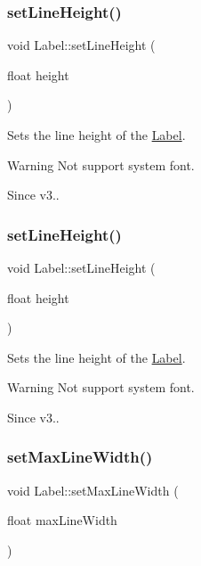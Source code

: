 \subsubsection{\texorpdfstring{set\+Line\+Height()}{setLineHeight()}\hspace{0.1cm}{\footnotesize\ttfamily [1/2]}}
{\footnotesize\ttfamily void Label\+::set\+Line\+Height (\begin{DoxyParamCaption}\item[{float}]{height }\end{DoxyParamCaption})}

Sets the line height of the \hyperlink{classLabel}{Label}. \begin{DoxyWarning}{Warning}
Not support system font. 
\end{DoxyWarning}
\begin{DoxySince}{Since}
v3.. 
\end{DoxySince}
\mbox{\label{classLabel_acb0bd4b5aa05360a85f18def21cd7e4d}} 
\subsubsection{\texorpdfstring{set\+Line\+Height()}{setLineHeight()}\hspace{0.1cm}{\footnotesize\ttfamily [2/2]}}
{\footnotesize\ttfamily void Label\+::set\+Line\+Height (\begin{DoxyParamCaption}\item[{float}]{height }\end{DoxyParamCaption})}

Sets the line height of the \hyperlink{classLabel}{Label}. \begin{DoxyWarning}{Warning}
Not support system font. 
\end{DoxyWarning}
\begin{DoxySince}{Since}
v3.. 
\end{DoxySince}
\mbox{\label{classLabel_ad7bd1d7f371a961f4c03c36ee31357b6}} 
\subsubsection{\texorpdfstring{set\+Max\+Line\+Width()}{setMaxLineWidth()}\hspace{0.1cm}{\footnotesize\ttfamily [1/2]}}
{\footnotesize\ttfamily void Label\+::set\+Max\+Line\+Width (\begin{DoxyParamCaption}\item[{float}]{max\+Line\+Width }\end{DoxyParamCaption})}


